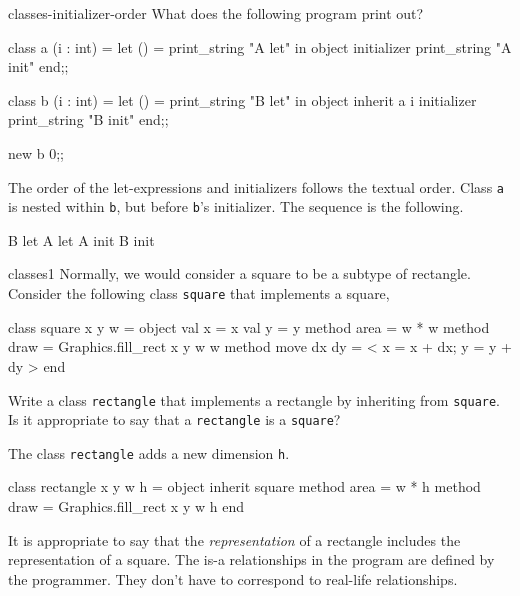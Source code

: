 %
\begin{exercise}{classes-initializer-order}
What does the following program print out?

\begin{ocaml}
class a (i : int) =
let () = print_string "A let\n" in
object
   initializer print_string "A init\n"
end;;

class b (i : int) =
let () = print_string "B let\n" in
object
   inherit a i
   initializer print_string "B init\n"
end;;

new b 0;;
\end{ocaml}

\begin{answer}\ifanswers
The order of the let-expressions and initializers follows the textual order.
Class \hbox{\lstinline/a/} is nested within \hbox{\lstinline/b/}, but before \hbox{\lstinline/b/}'s initializer.
The sequence is the following.

\begin{ocaml}
B let
A let
A init
B init
\end{ocaml}
\fi\end{answer}
\end{exercise}

%
\begin{exercise}{classes1}
Normally, we would consider a square to be a subtype of rectangle.
Consider the following class \hbox{\lstinline/square/} that implements a square,

\begin{ocaml}
class square x y w =
object
   val x = x
   val y = y
   method area = w * w
   method draw = Graphics.fill_rect x y w w
   method move dx dy = {< x = x + dx; y = y + dy >}
end
\end{ocaml}
%
Write a class \hbox{\lstinline/rectangle/} that implements a rectangle by inheriting from \hbox{\lstinline/square/}.
Is it appropriate to say that a \hbox{\lstinline/rectangle/} is a \hbox{\lstinline/square/}?

\begin{answer}\ifanswers
The class \hbox{\lstinline/rectangle/} adds a new dimension \hbox{\lstinline/h/}.
\begin{ocaml}
class rectangle x y w h =
object
   inherit square
   method area = w * h
   method draw = Graphics.fill_rect x y w h
end
\end{ocaml}
%
It is appropriate to say that the \emph{representation} of a rectangle includes the representation
of a square.  The is-a relationships in the program are defined by the programmer.  They don't have
to correspond to real-life relationships.
\fi\end{answer}
\end{exercise}

